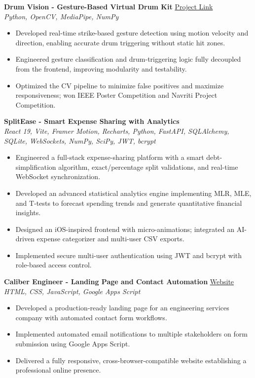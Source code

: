 \documentclass[10pt,a4paper]{article}
\begin{document}
\textbf{Drum Vision - Gesture-Based Virtual Drum Kit} \hfill \href{https://drum-vision.vercel.app/}{Project Link} \\
\textit{Python, OpenCV, MediaPipe, NumPy}
\begin{itemize}
    \item Developed real-time strike-based gesture detection using motion velocity and direction, enabling accurate drum triggering without static hit zones.
    \item Engineered gesture classification and drum-triggering logic fully decoupled from the frontend, improving modularity and testability.
    \item Optimized the CV pipeline to minimize false positives and maximize responsiveness; won IEEE Poster Competition and Navriti Project Competition.
\end{itemize}

\textbf{SplitEase - Smart Expense Sharing with Analytics} \\
\textit{React 19, Vite, Framer Motion, Recharts, Python, FastAPI, SQLAlchemy, SQLite, WebSockets, NumPy, SciPy, JWT, bcrypt}
\begin{itemize}
    \item Engineered a full-stack expense-sharing platform with a smart debt-simplification algorithm, exact/percentage split validations, and real-time WebSocket synchronization.
    \item Developed an advanced statistical analytics engine implementing MLR, MLE, and T-tests to forecast spending trends and generate quantitative financial insights.
    \item Designed an iOS-inspired frontend with micro-animations; integrated an AI-driven expense categorizer and multi-user CSV exports.
    \item Implemented secure multi-user authentication using JWT and bcrypt with role-based access control.
\end{itemize}

\textbf{Caliber Engineer - Landing Page and Contact Automation} \hfill \href{https://www.caliberengineer.com}{Website} \\
\textit{HTML, CSS, JavaScript, Google Apps Script}
\begin{itemize}
    \item Developed a production-ready landing page for an engineering services company with automated contact form workflows.
    \item Implemented automated email notifications to multiple stakeholders on form submission using Google Apps Script.
    \item Delivered a fully responsive, cross-browser-compatible website establishing a professional online presence.
\end{itemize}
\end{document}
